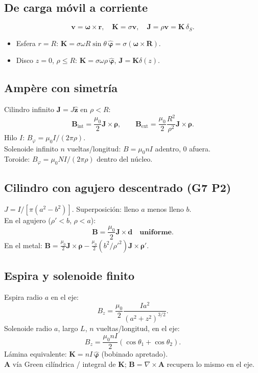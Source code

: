 \documentclass[10pt,a4paper]{article}
\newcommand{\vect}[1]{\mathbf{#1}}
\newcommand{\uv}[1]{\hat{\mathbf{#1}}}
\newcommand{\muo}{\mu_0}
\begin{document}
\subsection{De carga móvil a corriente}
\[
\vect{v}=\boldsymbol{\omega}\times\vect{r},\quad
\vect{K}=\sigma\vect{v},\quad
\vect{J}=\rho\vect{v}=\vect{K}\,\delta_S.
\]
\begin{itemize}
\item Esfera $r=R$: $\vect{K}=\sigma\omega R\sin\theta\,\uv{\varphi}=\sigma(\boldsymbol{\omega}\times\vect{R})$.
\item Disco $z=0$, $\rho\le R$: $\vect{K}=\sigma\omega\rho\,\uv{\varphi}$, $\vect{J}=\vect{K}\delta(z)$.
\end{itemize}

\subsection{Ampère con simetría}
Cilindro infinito $\vect{J}=J\uv{z}$ en $\rho<R$:
\[
\vect{B}_{\mathrm{int}}=\frac{\muo}{2}\vect{J}\times\boldsymbol{\rho},\qquad
\vect{B}_{\mathrm{ext}}=\frac{\muo}{2}\frac{R^2}{\rho^2}\vect{J}\times\boldsymbol{\rho}.
\]
Hilo $I$: $B_\varphi=\muo I/(2\pi\rho)$.\\
Solenoide infinito $n$ vueltas/longitud: $B=\muo n I$ adentro, $0$ afuera.\\
Toroide: $B_\varphi=\muo N I/(2\pi\rho)$ dentro del núcleo.

\subsection{Cilindro con agujero descentrado (G7 P2)}
$J=I/[\pi(a^2-b^2)]$. Superposición: lleno $a$ menos lleno $b$.\\
En el agujero ($\rho'<b$, $\rho<a$):
\[
\vect{B}=\frac{\muo}{2}\vect{J}\times\vect{d}\quad\textbf{uniforme}.
\]
En el metal: $\vect{B}=\frac{\muo}{2}\vect{J}\times\boldsymbol{\rho}-\frac{\muo}{2}(b^2/\rho'^2)\vect{J}\times\boldsymbol{\rho}'$.

\subsection{Espira y solenoide finito}
Espira radio $a$ en el eje:
\[
B_z=\frac{\muo}{2}\frac{I a^2}{(a^2+z^2)^{3/2}}.
\]
Solenoide radio $a$, largo $L$, $n$ vueltas/longitud, en el eje:
\[
B_z=\frac{\muo n I}{2}(\cos\theta_1+\cos\theta_2).
\]
Lámina equivalente: $\vect{K}=n I\,\uv{\varphi}$ (bobinado apretado).\\
$\vect{A}$ vía Green cilíndrica / integral de $\vect{K}$; $\vect{B}=\nabla\times\vect{A}$ recupera lo mismo en el eje.
\end{document}
